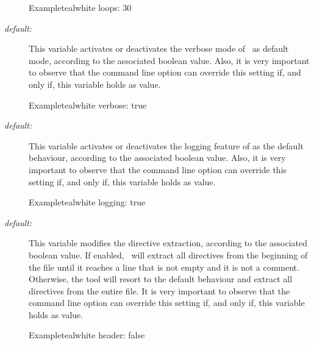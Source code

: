 \begin{description}
\begin{codebox}{Example}{teal}{\icnote}{white}
loops: 30
\end{codebox}

\item[\describecf{O}{boolean}{verbose}\hfill {\normalfont\itshape default:} \rbox{false}] This variable activates or deactivates the verbose mode of \arara\ as default mode, according to the associated boolean value. Also, it is very important to observe that the  command line option can override this setting if, and only if, this variable holds  as value.

\begin{codebox}{Example}{teal}{\icnote}{white}
verbose: true
\end{codebox}

\item[\describecf{O}{boolean}{logging}\hfill {\normalfont\itshape default:} \rbox{false}] This variable activates or deactivates the logging feature of \arara as the default behaviour, according to the associated boolean value. Also, it is very important to observe that the  command line option can override this setting if, and only if, this variable holds  as value.

\begin{codebox}{Example}{teal}{\icnote}{white}
logging: true
\end{codebox}

\item[\describecf{O}{boolean}{header}\hfill {\normalfont\itshape default:} \rbox{false}] This variable modifies the directive extraction, according to the associated boolean value. If enabled, \arara\ will extract all directives from the beginning of the file until it reaches a line that is not empty and it is not a comment. Otherwise, the tool will resort to the default behaviour and extract all directives from the entire file. It is very important to observe that the  command line option can override this setting if, and only if, this variable holds  as value.

\begin{codebox}{Example}{teal}{\icnote}{white}
header: false
\end{codebox}
\end{description}




